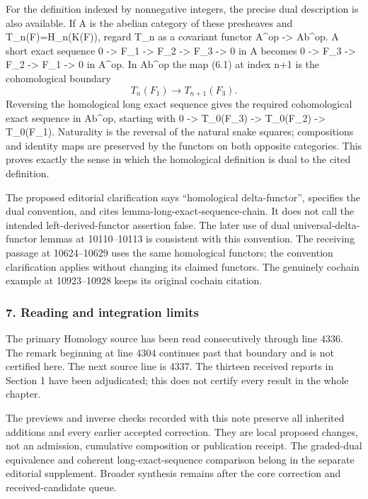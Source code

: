 \documentclass[11pt]{article}
\begin{document}
For the definition indexed by nonnegative integers, the precise dual description is also available. If A is the abelian category of these presheaves and T\_n(F)=H\_n(K(F)), regard T\_n as a covariant functor A\^{}op -\textgreater{} Ab\^{}op. A short exact sequence 0 -\textgreater{} F\_1 -\textgreater{} F\_2 -\textgreater{} F\_3 -\textgreater{} 0 in A becomes 0 -\textgreater{} F\_3 -\textgreater{} F\_2 -\textgreater{} F\_1 -\textgreater{} 0 in A\^{}op. In Ab\^{}op the map (6.1) at index n+1 is the cohomological boundary \[
T_n(F_1)\longrightarrow T_{n+1}(F_3).
\] Reversing the homological long exact sequence gives the required cohomological exact sequence in Ab\^{}op, starting with 0 -\textgreater{} T\_0(F\_3) -\textgreater{} T\_0(F\_2) -\textgreater{} T\_0(F\_1). Naturality is the reversal of the natural snake squares; compositions and identity maps are preserved by the functors on both opposite categories. This proves exactly the sense in which the homological definition is dual to the cited definition.

The proposed editorial clarification says ``homological delta-functor'', specifies the dual convention, and cites lemma-long-exact-sequence-chain. It does not call the intended left-derived-functor assertion false. The later use of dual universal-delta-functor lemmas at 10110--10113 is consistent with this convention. The receiving passage at 10624--10629 uses the same homological functors; the convention clarification applies without changing its claimed functors. The genuinely cochain example at 10923--10928 keeps its original cochain citation.

\subsubsection{7. Reading and integration limits}\label{reading-and-integration-limits}

The primary Homology source has been read consecutively through line 4336. The remark beginning at line 4304 continues past that boundary and is not certified here. The next source line is 4337. The thirteen received reports in Section 1 have been adjudicated; this does not certify every result in the whole chapter.

The previews and inverse checks recorded with this note preserve all inherited additions and every earlier accepted correction. They are local proposed changes, not an admission, cumulative composition or publication receipt. The graded-dual equivalence and coherent long-exact-sequence comparison belong in the separate editorial supplement. Broader synthesis remains after the core correction and received-candidate queue.
\clearpage
\end{document}
